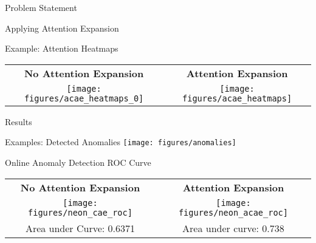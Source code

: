 \documentclass[10pt]{beamer}
\begin{document}
\begin{frame}{Problem Statement}
\begin{itemize}
\begin{frame}{Applying Attention Expansion}
\begin{exampleblock}{Example: Attention Heatmaps \cite{grad_cam}}
\begin{tabular}{c | c}
\textbf{No Attention Expansion} & \textbf{Attention Expansion}\\
\texttt{[image: figures/acae\_heatmaps\_0]} & \texttt{[image: figures/acae\_heatmaps]}
\end{tabular}
\end{exampleblock}
\end{frame}

\begin{frame}{Results}
\begin{exampleblock}{Examples: Detected Anomalies}
\texttt{[image: figures/anomalies]}
\end{exampleblock}

\begin{exampleblock}{Online Anomaly Detection ROC Curve}
\begin{tabular}{c | c}
\textbf{No Attention Expansion} & \textbf{Attention Expansion}\\
\texttt{[image: figures/neon\_cae\_roc]} & \texttt{[image: figures/neon\_acae\_roc]} \\
Area under Curve:  0.6371 & Area under curve: 0.738 \\ 
\end{tabular}
\end{exampleblock}
\end{frame}


%
%
%
%
%
%
%
%


\end{itemize}
\end{frame}
\end{document}

